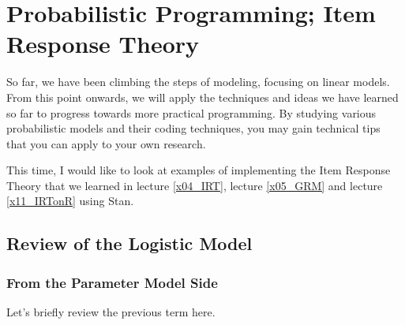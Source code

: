 \documentclass{ltjsbook}
\begin{document}
\chapter{Probabilistic Programming; Item Response Theory}
\label{x27_IRTonBayes}
So far, we have been climbing the steps of modeling, focusing on linear models.
From this point onwards, we will apply the techniques and ideas we have learned so far to progress towards more practical programming. By studying various probabilistic models and their coding techniques, you may gain technical tips that you can apply to your own research.

This time, I would like to look at examples of implementing the Item Response Theory that we learned in lecture \ref{x04_IRT}, lecture \ref{x05_GRM} and lecture \ref{x11_IRTonR} using Stan.
\section{Review of the Logistic Model}
\subsection{From the Parameter Model Side}
Let's briefly review the previous term here.
\end{document}
